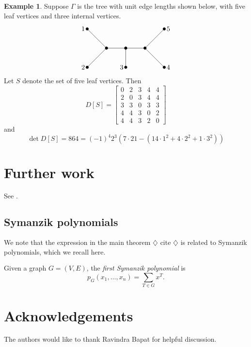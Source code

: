 \documentclass{amsart}
\theoremstyle{definition}
\newtheorem{eg}[thm]{Example}
\newcommand{\note}[1]{{\color{red} \sf $\diamondsuit$  {#1} $\diamondsuit$ }}
\newcommand{\todo}[1]{\note{#1}}
\begin{document}
\begin{eg}
Suppose $\Gamma$ is the tree with unit edge lengths shown below, with five leaf vertices and three internal vertices.
\[
\begin{tikzpicture}
	\filldraw[black] (-2,1) coordinate (1) circle (2pt);
	\filldraw[black] (-2,-1) coordinate (2) circle (2pt);
	\filldraw[black] (0,-1) coordinate (3) circle (2pt);
	\filldraw[black] (2,-1) coordinate (4) circle (2pt);
	\filldraw[black] (2,1) coordinate (5) circle (2pt);
	\filldraw[black] (-1,0) coordinate (A) circle (2pt);
	\filldraw[black] (0,0) coordinate (B) circle (2pt);
	\filldraw[black] (1,0) coordinate (C) circle (2pt);

	\node[left] at (1) {$1$};
	\node[left] at (2) {$2$};
	\node[left] at (3) {$3$};
	\node[right] at (4) {$4$};
	\node[right] at (5) {$5$};

	\draw (B) -- (A) -- (1);
	\draw (A) -- (2);
	\draw (3) -- (B) -- (C) -- (4);
	\draw (C) -- (5);
\end{tikzpicture}
\]
Let $S$ denote the set of five leaf vertices. Then
$$
D[S] = \begin{bmatrix}
0 & 2 & 3 & 4 & 4 \\
2 & 0 & 3 & 4 & 4 \\
3 & 3 & 0 & 3 & 3 \\
4 & 4 & 3 & 0 & 2 \\
4 & 4 & 3 & 2 & 0
\end{bmatrix}
$$
and
$$
\det D[S] = 864
= (-1)^4 2^3 \left( 7 \cdot 21 - (14 \cdot 1^2 + 4 \cdot 2^2 + 1 \cdot 3^2) \right)
$$
\end{eg}

\section{Further work}

See \cite{richman-shokrieh-wu}.

\subsection{Symanzik polynomials}

We note that the expression in the main theorem \todo{cite} is related to Symanzik polynomials, which we recall here.

Given a graph $G = (V, E)$, the {\em first Symanzik polynomial} is
\[
	p_G(x_1,\ldots, x_n) = \sum_{T \in G} x^T .
\]

\section*{Acknowledgements}
The authors would like to thank Ravindra Bapat for helpful discussion.


 

\end{document}
